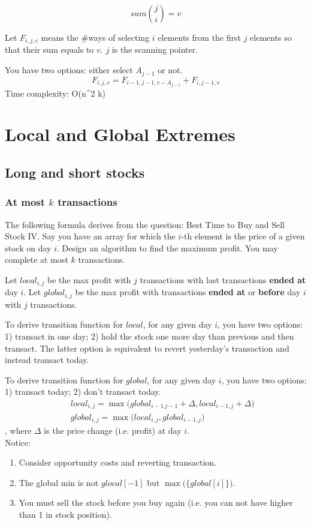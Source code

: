 {$$
sum{j \choose i} = v
$$

Let $F_{i, j, v}$ means the \#ways of selecting $i$ elements from the first $j$ elements so that their sum equals to $v$. $j$ is the scanning pointer.

You have two options: either select $A_{j-1}$ or not.
$$
F_{i, j, v} = F_{i-1, j-1, v-A_{j-1}} + F_{i, j-1, v}
$$
Time complexity: O(n^2 k)
\section{Local and Global Extremes}
\subsection{Long and short stocks}
\subsubsection{At most $k$ transactions}

The following formula derives from the question: Best Time to Buy and Sell Stock IV. Say you have an array for which the $i$-th element is the price of a given stock on day $i$. Design an algorithm to find the maximum profit. You may complete at most $k$ transactions. 

Let $local_{i, j}$ be the max profit with $j$ transactions with last transactions \textbf{ended at} day $i$. Let $global_{i, j}$ be the max profit with transactions \textbf{ended at} or \textbf{before} day $i$ with $j$ transactions. 

To derive transition function for $local$, for any given day $i$, you have two options: 1) transact in one day; 2) hold the stock one more day than previous and then transact. The latter option is equivalent to revert yesterday's transaction and instead transact today. 

To derive transition function for $global$, for any given day $i$, you have two options: 1) transact today; 2) don't transact today. 
\begin{eqnarray*}
&& local_{i,j} = \max\Big(global_{i-1.j-1}+\Delta, local_{i-1,j}+\Delta\Big) \nonumber \\
&& global_{i,j} = \max\Big(local_{i, j}, global_{i-1,j}\Big)
\end{eqnarray*}
, where $\Delta$ is the price change (i.e. profit) at day $i$.\\
Notice:
\begin{enumerate}
\item Consider opportunity costs and reverting transaction.
\item The global min is not $glocal[-1]$ but $\max\big(\{global[i]\}\big)$.
\item You must sell the stock before you buy again (i.e. you can not have higher than 1 in stock position). 
\end{enumerate}

}
